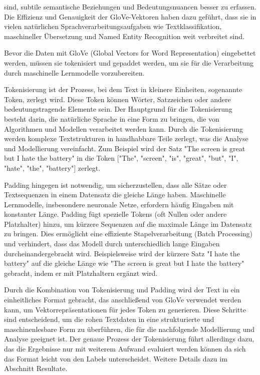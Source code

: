 \documentclass[12pt]{article}
\begin{document}
sind, subtile semantische Beziehungen und Bedeutungsnuancen besser zu erfassen. Die Effizienz und Genauigkeit der 
GloVe-Vektoren haben dazu geführt, dass sie in vielen natürlichen Sprachverarbeitungsaufgaben wie Textklassifikation, maschineller Übersetzung und 
Named Entity Recognition weit verbreitet sind.

Bevor die Daten mit GloVe (Global Vectors for Word Representation) eingebettet werden, müssen sie tokenisiert und gepaddet werden, um sie für die Verarbeitung durch maschinelle Lernmodelle vorzubereiten. 

Tokenisierung ist der Prozess, bei dem Text in kleinere Einheiten, sogenannte Token, zerlegt wird. Diese Token können Wörter, Satzzeichen oder andere bedeutungstragende Elemente sein. Der Hauptgrund für die Tokenisierung besteht darin, die natürliche Sprache in eine Form zu bringen, die von Algorithmen und Modellen verarbeitet werden kann. Durch die Tokenisierung werden komplexe Textstrukturen in handhabbare Teile zerlegt, was die Analyse und Modellierung vereinfacht. Zum Beispiel wird der Satz "The screen is great but I hate the battery" in die Token ["The", "screen", "is", "great", "but", "I", "hate", "the", "battery"] zerlegt.

Padding hingegen ist notwendig, um sicherzustellen, dass alle Sätze oder Textsequenzen in einem Datensatz die gleiche Länge haben. Maschinelle Lernmodelle, insbesondere neuronale Netze, erfordern häufig Eingaben mit konstanter Länge. Padding fügt spezielle Tokens (oft Nullen oder andere Platzhalter) hinzu, um kürzere Sequenzen auf die maximale Länge im Datensatz zu bringen. Dies ermöglicht eine effiziente Stapelverarbeitung (Batch Processing) und verhindert, dass das Modell durch unterschiedlich lange Eingaben durcheinandergebracht wird. Beispielsweise wird der kürzere Satz "I hate the battery" auf die gleiche Länge wie "The screen is great but I hate the battery" gebracht, indem er mit Platzhaltern ergänzt wird.

Durch die Kombination von Tokenisierung und Padding wird der Text in ein einheitliches Format gebracht, das anschließend von GloVe verwendet werden kann, um Vektorrepräsentationen für jedes Token zu generieren. Diese Schritte sind entscheidend, um die rohen Textdaten in eine strukturierte und maschinenlesbare Form zu überführen, die für die nachfolgende Modellierung und Analyse geeignet ist. Der genaue Prozess der Tokenisierung führt allerdings dazu, das die Ergebnisse nur mit weiterem Aufwand evaluiert werden können da sich das Format leicht von den Labels unterscheidet. Weitere Details dazu im Abschnitt Resultate.
\end{document}
